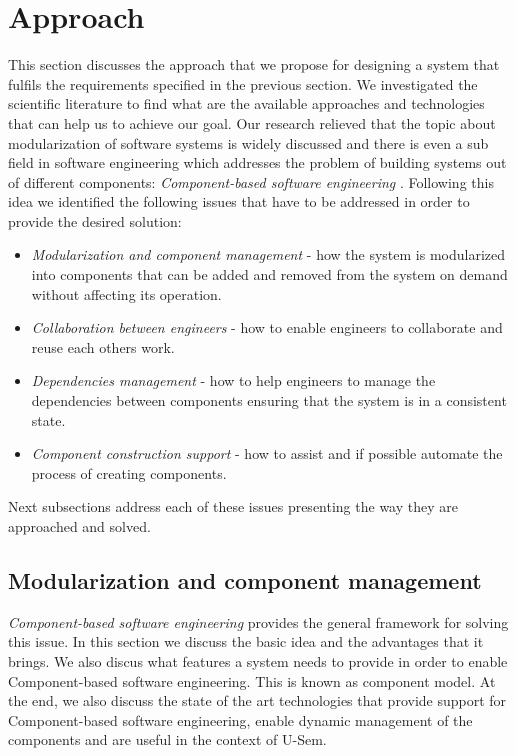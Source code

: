 \section{Approach}
\label{sec:approachPlugin}

This section discusses the approach that we propose for designing a system that fulfils the requirements specified in the previous section. We investigated the scientific literature to find what are the available approaches and technologies that can help us to achieve our goal. Our research relieved that the topic about modularization of software systems is widely discussed and there is even a sub field in software engineering which addresses the problem of building systems out of different components: \textit{Component-based software engineering}  \cite{jifeng2005component}. Following this idea we identified the following issues that have to be addressed in order to provide the desired solution:

\begin{itemize}
	\item \textit{Modularization and component management} - how the system is modularized into components that can be added and removed from the system on demand without affecting its operation.
	\item \textit{Collaboration between engineers} - how to enable engineers to collaborate and reuse each others work.
	\item \textit{Dependencies management} - how to help engineers to manage the dependencies between components ensuring that the system is in a consistent state.
	\item \textit{Component construction support} - how to assist and if possible automate the process of creating components.
\end{itemize}

Next subsections address each of these issues presenting the way they are approached and solved. 

\subsection{Modularization and component management}

\textit{Component-based software engineering} provides the general framework for solving this issue. In this section we discuss the basic idea and the advantages that it brings. We also discus what features a system needs to provide in order to enable Component-based software engineering. This is known as component model. At the end, we also discuss the state of the art technologies that provide support for Component-based software engineering, enable dynamic management of the components and are useful in the context of U-Sem. 

